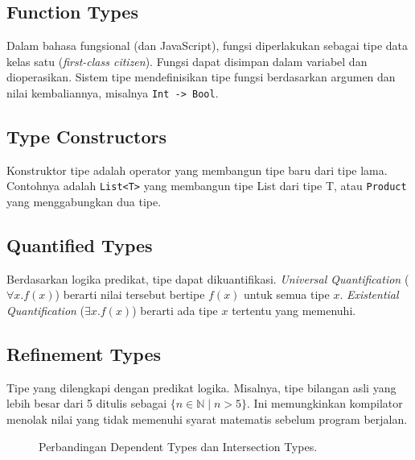 \documentclass[11pt,a4paper]{article}
\begin{document}
	\subsection{Function Types}
	Dalam bahasa fungsional (dan JavaScript), fungsi diperlakukan sebagai tipe data kelas satu (\textit{first-class citizen}). Fungsi dapat disimpan dalam variabel dan dioperasikan. Sistem tipe mendefinisikan tipe fungsi berdasarkan argumen dan nilai kembaliannya, misalnya \texttt{Int -> Bool}.
	
	\subsection{Type Constructors}
	Konstruktor tipe adalah operator yang membangun tipe baru dari tipe lama. Contohnya adalah \texttt{List<T>} yang membangun tipe List dari tipe T, atau \texttt{Product} yang menggabungkan dua tipe.
	
	\subsection{Quantified Types}
	Berdasarkan logika predikat, tipe dapat dikuantifikasi. \textit{Universal Quantification} ($\forall x. f(x)$) berarti nilai tersebut bertipe $f(x)$ untuk semua tipe $x$. \textit{Existential Quantification} ($\exists x. f(x)$) berarti ada tipe $x$ tertentu yang memenuhi.
	
	\subsection{Refinement Types}
	Tipe yang dilengkapi dengan predikat logika. Misalnya, tipe bilangan asli yang lebih besar dari 5 ditulis sebagai $\{n \in \mathbb{N} \mid n > 5\}$. Ini memungkinkan kompilator menolak nilai yang tidak memenuhi syarat matematis sebelum program berjalan.
	
	\begin{figure}[H]
		\centering
		\caption{Perbandingan Dependent Types dan Intersection Types.}
		\label{fig:advanced}
	\end{figure}
	
\end{document}
